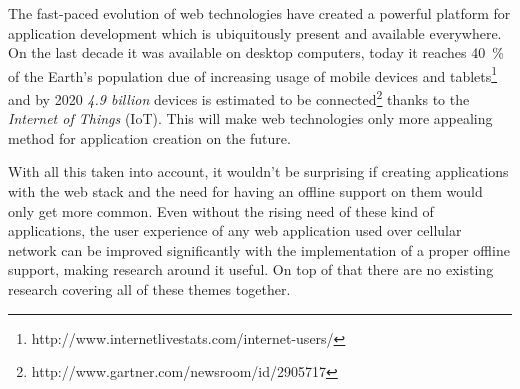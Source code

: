 The fast-paced evolution of web technologies have created a powerful platform for application development which is ubiquitously present and available everywhere. On the last decade it was available on desktop computers, today it reaches 40~\% of the Earth's population due of increasing usage of mobile devices and tablets\footnote{http://www.internetlivestats.com/internet-users/} and by 2020 \textit{4.9 billion} devices is estimated to be connected\footnote{http://www.gartner.com/newsroom/id/2905717} thanks to the \textit{Internet of Things} (IoT). This will make web technologies only more appealing method for application creation on the future.

With all this taken into account, it wouldn't be surprising if creating applications with the web stack and the need for having an offline support on them would only get more common. Even without the rising need of these kind of applications, the user experience of any web application used over cellular network can be improved significantly with the implementation of a proper offline support, making research around it useful. On top of that there are no existing research covering all of these themes together.









